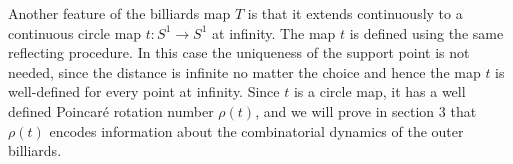 \documentclass[11pt, oneside]{article}   	%
\begin{document}
\indent Another feature of the billiards map $T$ is that it extends continuously to a continuous circle map $t:S^1\to S^1$ at infinity. The map $t$ is defined using the same reflecting procedure. In this case the uniqueness of the support point is not needed, since the distance is infinite no matter the choice and hence the map $t$ is well-defined for every point at infinity. Since $t$ is a circle map, it has a well defined Poincar\'{e} rotation number $\rho(t)$, and we will prove in section 3 that $\rho(t)$ encodes information about the combinatorial dynamics of the outer billiards.

\end{document}
